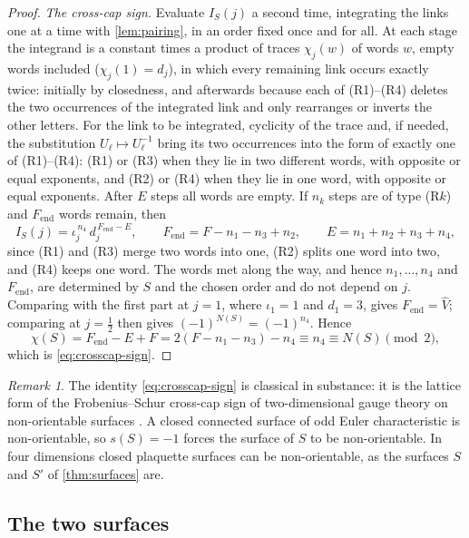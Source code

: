 \documentclass[11pt,a4paper]{amsart}
\theoremstyle{definition}
\theoremstyle{remark}
\newtheorem{remark}[theorem]{Remark}
\numberwithin{equation}{section}
\begin{document}
\begin{proof}
\emph{The cross-cap sign.} Evaluate $I_S(j)$ a second time, integrating the links one at a time with \cref{lem:pairing}, in an order fixed once and for all. At each stage the integrand is a constant times a product of traces $\chi_j(w)$ of words $w$, empty words included ($\chi_j(1)=d_j$), in which every remaining link occurs exactly twice: initially by closedness, and afterwards because each of (R1)--(R4) deletes the two occurrences of the integrated link and only rearranges or inverts the other letters. For the link to be integrated, cyclicity of the trace and, if needed, the substitution $U_\ell\mapsto U_\ell^{-1}$ bring its two occurrences into the form of exactly one of (R1)--(R4): (R1) or (R3) when they lie in two different words, with opposite or equal exponents, and (R2) or (R4) when they lie in one word, with opposite or equal exponents. After $E$ steps all words are empty. If $n_k$ steps are of type (R$k$) and $F_{\mathrm{end}}$ words remain, then
\[
I_S(j)=\iota_j^{\,n_4}\,d_j^{\,F_{\mathrm{end}}-E},\qquad F_{\mathrm{end}}=F-n_1-n_3+n_2,\qquad E=n_1+n_2+n_3+n_4,
\]
since (R1) and (R3) merge two words into one, (R2) splits one word into two, and (R4) keeps one word. The words met along the way, and hence $n_1,\dots,n_4$ and $F_{\mathrm{end}}$, are determined by $S$ and the chosen order and do not depend on $j$. Comparing with the first part at $j=1$, where $\iota_1=1$ and $d_1=3$, gives $F_{\mathrm{end}}=\hat V$; comparing at $j=\frac12$ then gives $(-1)^{N(S)}=(-1)^{n_4}$. Hence
\[
\chi(S)=F_{\mathrm{end}}-E+F=2(F-n_1-n_3)-n_4\equiv n_4\equiv N(S)\pmod 2,
\]
which is \eqref{eq:crosscap-sign}.
\end{proof}

\begin{remark}\label{rem:crosscap-sign}
The identity \eqref{eq:crosscap-sign} is classical in substance: it is the lattice form of the Frobenius--Schur cross-cap sign of two-dimensional gauge theory on non-orientable surfaces \cite{witten1991,drouffe1983}. A closed connected surface of odd Euler characteristic is non-orientable, so $s(S)=-1$ forces the surface of $S$ to be non-orientable. In four dimensions closed plaquette surfaces can be non-orientable, as the surfaces $S$ and $S'$ of \cref{thm:surfaces} are.
\end{remark}

\subsection{The two surfaces}
\end{document}
